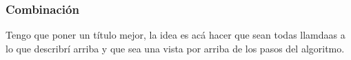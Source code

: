 \subsubsection{Combinación}

Tengo que poner un título mejor, la idea es acá hacer que sean todas llamdaas a
lo que describrí arriba y que sea una vista por arriba de los pasos del
algoritmo.
